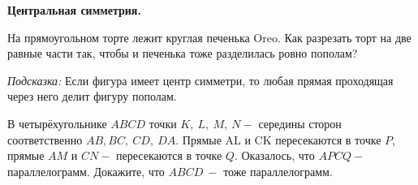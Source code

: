 \centerline{\Large \bf Центральная симметрия.}

 На прямоугольном торте лежит круглая печенька Oreo. Как разрезать торт на две равные части так, чтобы и печенька тоже разделилась ровно пополам?

\textit{Подсказка:} Если фигура имеет центр симметри, то любая прямая проходящая через него делит фигуру пополам.

 В четырёхугольнике $ABCD$ точки $K,\ L,\ M,\ N -$ середины сторон соответственно $AB,  BC,\  CD,\  DA$. Прямые AL и CK пересекаются в точке $P$, прямые $AM$ и $CN -$ пересекаются в точке $Q$. Оказалось, что $APCQ - $ параллелограмм. Докажите, что $ABCD\ -$ тоже параллелограмм.